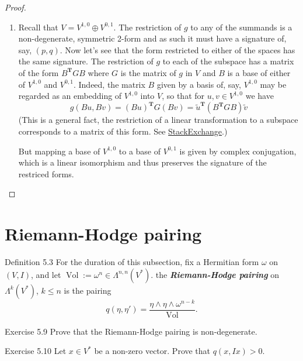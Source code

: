 \begin{proof}
\begin{enumerate}[label=\alph*.]
\item Recall that $V=V^{1,0} \oplus V^{0,1}$. The restriction of $g$ to any of the summands is a non-degenerate, symmetric 2-form and as such it must have a signature of, say, $(p,q)$. Now let's see that the form restricted to either of the spaces has the same signature. The restriction of $g$ to each of the subspace has a matrix of the form $B^{\mathbf{T}}GB$ where $G$ is the matrix of $g$ in $V$ and $B$ is a base of either of  $V^{1,0}$ and $V^{0,1}$. Indeed, the matrix $B$ given by a basis of, say, $V^{1,0}$ may be regarded as an embedding of $V^{1,0}$ into $V$, so that for $u,v\in V^{1,0}$ we have
	\[g(Bu,Bv)=(Bu)^{\mathbf{T}}G(Bv)=\tilde{u}^{\mathbf{T}}(B^{\mathbf{T}}GB)\tilde{v}\]
	(This is a general fact, the restriction of a linear transformation to a subspace corresponds to a matrix of this form. See \href{https://math.stackexchange.com/questions/4386914/given-the-matrix-of-an-r4-scalar-product-b-in-its-standard-basis-and-a-subspa/4387198#4387198}{StackExchange}.)

	But mapping a base of $V^{1,0}$ to a base of $V^{0,1}$ is given by complex conjugation, which is a linear isomorphism and thus preserves the signature of the restriced forms.


	
\end{enumerate}
\end{proof}
\iffalse

\section{Riemann-Hodge pairing}

\begin{thing7}{Definition 5.3}\leavevmode
	For the duration of this subsection, fix a Hermitian form $\omega$ on $(V,I)$, and let  $\operatorname{Vol}:=\omega^n\in\Lambda^{n,n}(V^*)$. the \textit{\textbf{Riemann-Hodge pairing}}  on $\Lambda^{k}(V^*)$, $k\leq n$ is the pairing
	\[q(\eta,\eta')=\dfrac{\eta\wedge \eta\wedge \omega^{n-k}}{\operatorname{Vol}}.\]
\end{thing7}

\begin{thing1}{Exercise 5.9}\leavevmode
	Prove that the Riemann-Hodge pairing is non-degenerate.
\end{thing1}

\begin{thing7}{Exercise 5.10}\leavevmode
	Let $x\in V^*$ be a non-zero vector. Prove that $q(x,Ix)>0$.
\end{thing7}

